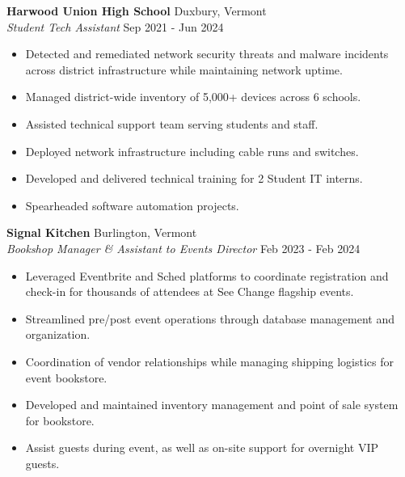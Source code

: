 \documentclass{article}
\begin{document}
\noindent \textbf{Harwood Union High School} \hfill Duxbury, Vermont \\
\textit{Student Tech Assistant} \hfill Sep 2021 - Jun 2024
\begin{itemize}[noitemsep,nolistsep,leftmargin=*]
\item {Detected and remediated network security threats and malware incidents across district infrastructure while maintaining network uptime.}
\item {Managed district-wide inventory of 5,000+ devices across 6 schools.}
\item {Assisted technical support team serving students and staff.}
\item {Deployed network infrastructure including cable runs and switches.}
\item {Developed and delivered technical training for 2 Student IT interns.}
\item {Spearheaded software automation projects. \\}
\end{itemize}

\noindent \textbf{Signal Kitchen} \hfill Burlington, Vermont \\
\textit{Bookshop Manager \& Assistant to Events Director} \hfill Feb 2023 - Feb 2024
\begin{itemize}[noitemsep,nolistsep,leftmargin=*]
\item {Leveraged Eventbrite and Sched platforms to coordinate registration and check-in for thousands of attendees at See Change flagship events.}
\item {Streamlined pre/post event operations through database management and organization.}
\item {Coordination of vendor relationships while managing shipping logistics for event bookstore.}
\item {Developed and maintained inventory management and point of sale system for bookstore.}
\item {Assist guests during event, as well as on-site support for overnight VIP guests.}
\end{itemize}
\end{document}
